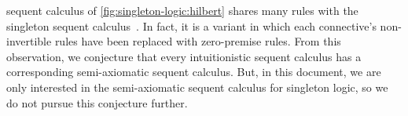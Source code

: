 











 sequent calculus of \cref{fig:singleton-logic:hilbert} shares many rules with the singleton sequent calculus~.
In fact, it is a variant in which each connective's non-invertible rules have been replaced with zero-premise rules.
From this observation, we conjecture that every intuitionistic sequent calculus has a corresponding semi-axiomatic sequent calculus.
But, in this document, we are only interested in the semi-axiomatic sequent calculus for singleton logic, so we do not pursue this conjecture further.

